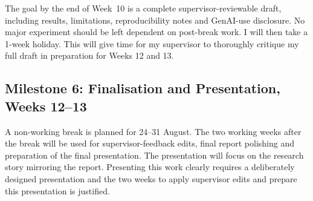 The goal by the end of Week~10 is a complete supervisor-reviewable draft, including results, limitations, reproducibility notes and GenAI-use disclosure. No major experiment should be left dependent on post-break work. I will then take a 1-week holiday. This will give time for my supervisor to thoroughly critique my full draft in preparation for Weeks 12 and 13.

\subsection{Milestone 6: Finalisation and Presentation, Weeks 12--13}
\label{subsec:milestone-finalisation}

A non-working break is planned for 24--31 August. The two working weeks after the break will be used for supervisor-feedback edits, final report polishing and preparation of the final presentation. The presentation will focus on the research story mirroring the report. Presenting this work clearly requires a deliberately designed presentation and the two weeks to apply supervisor edits and prepare this presentation is justified.

